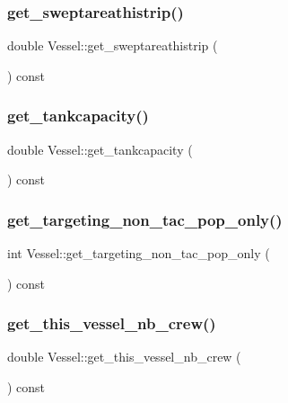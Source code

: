 \subsubsection{\texorpdfstring{get\_sweptareathistrip()}{get\_sweptareathistrip()}}
{\footnotesize\ttfamily double Vessel\+::get\+\_\+sweptareathistrip (\begin{DoxyParamCaption}{ }\end{DoxyParamCaption}) const}

\mbox{\label{class_vessel_ab4bed530d5c17ad2cbd6c473a91c1812}} 
\subsubsection{\texorpdfstring{get\_tankcapacity()}{get\_tankcapacity()}}
{\footnotesize\ttfamily double Vessel\+::get\+\_\+tankcapacity (\begin{DoxyParamCaption}{ }\end{DoxyParamCaption}) const}

\mbox{\label{class_vessel_a8de78109d5763714b2a045e45a6bef09}} 
\subsubsection{\texorpdfstring{get\_targeting\_non\_tac\_pop\_only()}{get\_targeting\_non\_tac\_pop\_only()}}
{\footnotesize\ttfamily int Vessel\+::get\+\_\+targeting\+\_\+non\+\_\+tac\+\_\+pop\+\_\+only (\begin{DoxyParamCaption}{ }\end{DoxyParamCaption}) const}

\mbox{\label{class_vessel_a8074f6427505f95444d263101a422c78}} 
\subsubsection{\texorpdfstring{get\_this\_vessel\_nb\_crew()}{get\_this\_vessel\_nb\_crew()}}
{\footnotesize\ttfamily double Vessel\+::get\+\_\+this\+\_\+vessel\+\_\+nb\+\_\+crew (\begin{DoxyParamCaption}{ }\end{DoxyParamCaption}) const}


